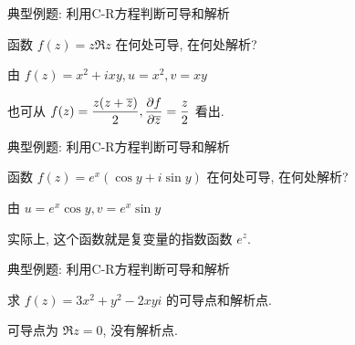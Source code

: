\begin{frame}{典型例题: 利用C-R方程判断可导和解析}
\beqskip{5pt}
\onslide<+->
\begin{example}[续]
 函数 $f(z)=z\Re z$ 在何处可导, 在何处解析?
\end{example}
\onslide<+->
\begin{solution*}
由 $f(z)=x^2+ixy,u=x^2,v=xy$
%
\vspace{-\baselineskip}
\end{solution*}
\onslide<+->也可从 $f(z)=\dfrac{z(z+\overline z)}2,\dfrac{\partial f}{\partial\overline z}=\dfrac z2$ 看出.
\endgroup
\end{frame}


\begin{frame}{典型例题: 利用C-R方程判断可导和解析}
\onslide<+->
\begin{example}[续]
 函数 $f(z)=e^x(\cos y+i\sin y)$ 在何处可导, 在何处解析?
\end{example}
\onslide<+->
\begin{solution}
由 $u=e^x\cos y,v=e^x\sin y$
\end{solution}
\onslide<+->
实际上, 这个函数就是复变量的指数函数 $e^z$.
\end{frame}


\begin{frame}{典型例题: 利用C-R方程判断可导和解析}
\onslide<+->
\begin{exercise}
求 $f(z)=3x^2+y^2-2xyi$ 的可导点和解析点.
\end{exercise}
\onslide<+->
\begin{answer}
可导点为 $\Re z=0$, 没有解析点.
\end{answer}
\end{frame}


